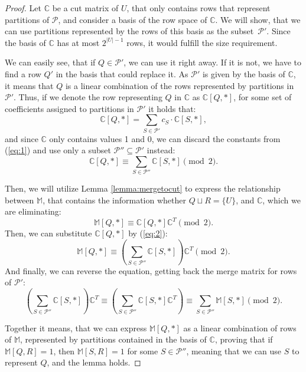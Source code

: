 \documentclass[thesis=M,english,hidelinks]{FITthesis}[2012/10/20]
\theoremstyle{definition}
\begin{document}
\begin{proof}
    Let $\mathbb{C}$ be a cut matrix of $U$, that only contains rows that represent partitions of $\mathcal{P}$, and
    consider a basis of the row space of $\mathbb{C}$. We will show, that we can use partitions represented by the rows
    of this basis as the subset~$\mathcal{P}'$. Since the basis of $\mathbb{C}$ has at most $2^{|U|-1}$ rows, it would
    fulfill the size requirement.

    We can easily see, that if $Q \in \mathcal{P'}$, we can use it right away. If it is not, we have to find a row $Q'$ in
    the basis that could replace it. As $\mathcal{P}'$ is given by the basis of $\mathbb{C}$, it means that $Q$ is a
    linear combination of the rows represented by partitions in $\mathcal{P}'$. Thus, if we denote the row representing
    $Q$ in $\mathbb{C}$ as $\mathbb{C}[Q,*]$, for some set of coefficients assigned to partitions in $\mathcal{P}'$ it
    holds that:
    \begin{equation}
        \label{eq:1}
        \mathbb{C}[Q,*] = \sum_{S \in \mathcal{P}'} c_S \cdot \mathbb{C}[S,*],
    \end{equation}
    and since $\mathbb{C}$ only contains values 1 and 0, we can discard the constants from (\ref{eq:1}) and use only a
    subset $\mathcal{P}'' \subseteq \mathcal{P}'$ instead:
    \begin{equation}
        \label{eq:2}
        \mathbb{C}[Q,*] \equiv \sum_{S \in \mathcal{P}''} \mathbb{C}[S,*] \pmod{2}.
    \end{equation}

    Then, we will utilize Lemma \ref{lemma:mergetocut} to express the relationship between $\mathbb{M}$, that contains
    the information whether $Q \sqcup R = \{U\}$, and $\mathbb{C}$, which we are eliminating:
    $$
        \mathbb{M}[Q, *] \equiv \mathbb{C}[Q, *] \mathbb{C}^T \pmod{2}.
    $$
    Then, we can substitute $\mathbb{C}[Q, *]$ by (\ref{eq:2}):
    $$
    \mathbb{M}[Q, *] \equiv \left( \sum_{S \in \mathcal{P}''} \mathbb{C}[S,*] \right) \mathbb{C}^T \pmod{2}.
    $$
    And finally, we can reverse the equation, getting back the merge matrix for rows of $\mathcal{P}'$:
    $$
    \left( \sum_{S \in \mathcal{P}''} \mathbb{C}[S,*] \right) \mathbb{C}^T
    \equiv
    \left( \sum_{S \in \mathcal{P}''} \mathbb{C}[S,*] \mathbb{C}^T \right)
    \equiv
    \sum_{S \in \mathcal{P}''} \mathbb{M}[S,*]
    \pmod{2}.
    $$

    Together it means, that we can express $\mathbb{M}[Q, *]$ as a linear combination of rows of $\mathbb{M}$,
    represented by partitions contained in the basis of $\mathbb{C}$, proving that if $\mathbb{M}[Q, R] = 1$, then
    $\mathbb{M}[S, R] = 1$ for some $S \in \mathcal{P}''$, meaning that we can use $S$ to represent $Q$, and the
    lemma holds.
\end{proof}
\end{document}
